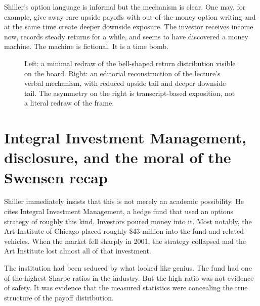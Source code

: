 Shiller's option language is informal but the mechanism is clear. One may, for example, give away rare upside payoffs with out-of-the-money option writing and at the same time create deeper downside exposure. The investor receives income now, records steady returns for a while, and seems to have discovered a money machine. The machine is fictional. It is a time bomb.

\begin{figure}
\centering
{}
\hspace{1cm}
\caption{Left: a minimal redraw of the bell-shaped return distribution visible on the board. Right: an editorial reconstruction of the lecture's verbal mechanism, with reduced upside tail and deeper downside tail. The asymmetry on the right is transcript-based exposition, not a literal redraw of the frame.}
\end{figure}

\section{Integral Investment Management, disclosure, and the moral of the Swensen recap}

Shiller immediately insists that this is not merely an academic possibility. He cites Integral Investment Management, a hedge fund that used an options strategy of roughly this kind. Investors poured money into it. Most notably, the Art Institute of Chicago placed roughly \$43 million into the fund and related vehicles. When the market fell sharply in 2001, the strategy collapsed and the Art Institute lost almost all of that investment.

The institution had been seduced by what looked like genius. The fund had one of the highest Sharpe ratios in the industry. But the high ratio was not evidence of safety. It was evidence that the measured statistics were concealing the true structure of the payoff distribution.

